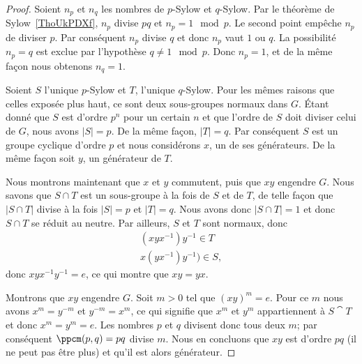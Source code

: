 \begin{proof}
    Soient \( n_p\) et \( n_q\) les nombres de \( p\)-Sylow et \( q\)-Sylow. Par le théorème de Sylow~\ref{ThoUkPDXf}, \( n_p\) divise \( pq\) et \( n_p=1\mod p\). Le second point empêche \( n_p\) de diviser \( p\). Par conséquent \( n_p\) divise \( q\) et donc \( n_p\) vaut \( 1\) ou \( q\). La possibilité \( n_p=q\) est exclue par l'hypothèse \( q\neq 1\mod p\). Donc \( n_p=1\), et de la même façon nous obtenons \( n_q=1\).

    Soient \( S\) l'unique \( p\)-Sylow et \( T\), l'unique \( q\)-Sylow. Pour les mêmes raisons que celles exposée plus haut, ce sont deux sous-groupes normaux dans \( G\). Étant donné que \( S\) est d'ordre \( p^n\) pour un certain \( n\) et que l'ordre de \( S\) doit diviser celui de \( G\), nous avons \( |S|=p\). De la même façon, \( | T |=q\). Par conséquent \( S\) est un groupe cyclique d'ordre \( p\) et nous considérons \( x\), un de ses générateurs. De la même façon soit \( y\), un générateur de \( T\).

    Nous montrons maintenant que \( x\) et \( y\) commutent, puis que \( xy\) engendre \( G\). Nous savons que \( S\cap T\) est un sous-groupe à la fois de \( S\) et de \( T\), de telle façon que \( | S\cap T |\) divise à la fois \( | S |=p\) et \( | T |=q\). Nous avons donc \( | S\cap T |=1\) et donc \( S\cap T\) se réduit au neutre. Par ailleurs, \( S\) et \( T\) sont normaux, donc
    \begin{subequations}
        \begin{align}
            (xyx^{-1})y^{-1}\in T\\
            x(yx^{-1})y^{-1})\in S,
        \end{align}
    \end{subequations}
    donc \( xyx^{-1}y^{-1}=e\), ce qui montre que \( xy=yx\).

    Montrons que \( xy\) engendre \( G\). Soit \( m>0\) tel que \( (xy)^m=e\). Pour ce \( m\) nous avons \( x^m=y^{-m}\) et \( y^{-m}=x^m\), ce qui signifie que \( x^m\) et \( y^m\) appartiennent à \( S\cat T\) et donc \( x^m=y^m=e\). Les nombres \( p\) et \( q\) divisent donc tous deux \( m\); par conséquent \( \ppcm(p,q)=pq\) divise \( m\). Nous en concluons que \( xy\) est d'ordre \( pq\) (il ne peut pas être plus) et qu'il est alors générateur.


\end{proof}
